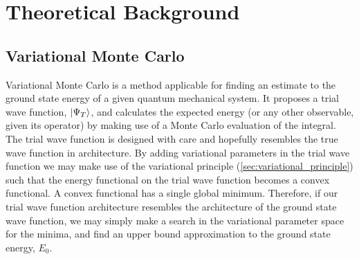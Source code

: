 \section{Theoretical Background}\label{sec:Theory}

\subsection{Variational Monte Carlo}
Variational Monte Carlo is a method applicable for finding an estimate to the ground state energy of a given quantum mechanical system. It proposes a trial wave function, $\ket{\Psi_T}$, and calculates the expected energy (or any other observable, given its operator) by making use of a Monte Carlo evaluation of the integral. The trial wave function is designed with care and hopefully resembles the true wave function in architecture. By adding variational parameters in the trial wave function we may make use of the variational principle (\autoref{sec:variational_principle}) such that the energy functional on the trial wave function becomes a convex functional. A convex functional has a single global minimum. Therefore, if our trial wave function architecture resembles the architecture of the ground state wave function, we may simply make a search in the variational parameter space for the minima, and find an upper bound approximation to the ground state energy, $E_0$.
